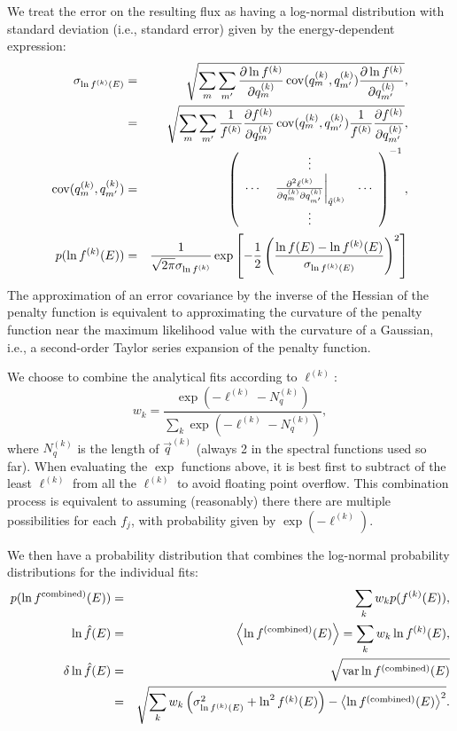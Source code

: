 \documentclass{article}    %
\newcommand{\cov}{\mathop{{\rm cov}}}
\newcommand{\var}{\mathop{{\rm var}}}
\begin{document}
We treat the error on the resulting flux as having a log-normal
distribution with standard deviation (i.e., standard error) given by
the energy-dependent expression:
\begin{eqnarray}
\sigma_{\ln f^{(k)}(E)} &=& \sqrt{
\sum_m \sum_{m'} \frac{\partial \ln f^{(k)}}{\partial q^{(k)}_m} \cov(q^{(k)}_m,q^{(k)}_{m'}) \frac{\partial \ln f^{(k)}}{\partial q^{(k)}_{m'}} 
}, \nonumber \\
&=& \sqrt{
\sum_m \sum_{m'} \frac{1}{f^{(k)}} \frac{\partial f^{(k)}}{\partial q^{(k)}_m} \cov(q^{(k)}_m,q^{(k)}_{m'}) \frac{1}{f^{(k)}} \frac{\partial f^{(k)}}{\partial q^{(k)}_{m'}} 
}, \\
\cov(q^{(k)}_m,q^{(k)}_{m'}) &=& \left(
\begin{array}{ccc}
~ & \vdots & ~ \\
\cdots & \left.
\frac{\partial^2 \ell^{(k)}}{\partial q^{(k)}_m \partial q^{(k)}_{m'}}
\right|_{\hat{q}^{(k)}}
& \cdots \\
~ & \vdots & ~ 
\end{array}
\right)^{-1}, \\
p(\ln f^{(k)}(E)) &=& \frac{1}{\sqrt{2\pi}\sigma_{\ln f^{(k)}}}\exp\left[
-\frac{1}{2}\left(\frac{\ln f(E) - \ln f^{(k)}(E)}{\sigma_{\ln f^{(k)}(E)}}\right)^2
\right]
\end{eqnarray}
The approximation of an error covariance by the inverse of the Hessian
of the penalty function is equivalent to approximating the curvature
of the penalty function near the maximum likelihood value with the
curvature of a Gaussian, i.e., a second-order Taylor series expansion
of the penalty function.

We choose to combine the analytical fits according to $\ell^{(k)}$:
\begin{equation}
w_k = \frac{\exp(-\ell^{(k)}-N^{(k)}_q)}{\sum_k \exp(-\ell^{(k)}-N^{(k)}_q)},
\end{equation}
where $N^{(k)}_q$ is the length of $\vec{q}^{(k)}$ (always 2 in the
spectral functions used so far).  When evaluating the $\exp$ functions
above, it is best first to subtract of the least $\ell^{(k)}$ from all
the $\ell^{(k)}$ to avoid floating point overflow. This combination
process is equivalent to assuming (reasonably) there there are
multiple possibilities for each $f_j$, with probability given by
$\exp(-\ell^{(k)})$.

We then have a probability distribution that combines the log-normal
probability distributions for the individual fits:
\begin{eqnarray}
p(\ln f^{\rm combined)}(E)) &=& \sum_k w_k p(f^{(k)}(E)), \\
\ln \hat{f}(E) &=& \left<\ln f^{\rm (combined)}(E)\right> = \sum_k w_k \ln f^{(k)}(E), \\
\delta\ln\hat{f}(E) &=& \sqrt{\var \ln f^{\rm (combined)}(E)} \nonumber \\
&=& 
\sqrt{\sum_k w_k \left(\sigma^2_{\ln f^{(k)}(E)}+\ln^2f^{(k)}(E)\right) - \left<\ln f^{\rm (combined)}(E)\right>^2}.
\end{eqnarray}
\end{document}
